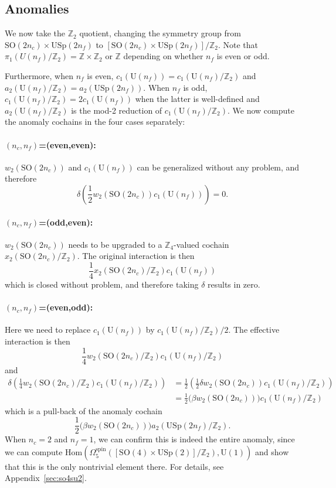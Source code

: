 \documentclass[12pt]{article}
\numberwithin{equation}{section}
\def\bZ{\mathbb{Z}}
\def\U{\mathrm{U}}
\def\SO{\mathrm{SO}}
\def\USp{\mathrm{USp}}
\begin{document}
\subsection{Anomalies}
We now take the $\bZ_2$ quotient, changing the symmetry group from 
$\SO(2n_c)\times \USp(2n_f)$ to $[\SO(2n_c)\times \USp(2n_f)]/\bZ_2$.
Note that $\pi_1(U(n_f)/\bZ_2)=\bZ\times \bZ_2$  or $\bZ$ depending on whether $n_f$ is even or odd.

Furthermore, when $n_f$ is even, $c_1(\U(n_f)) = c_1(\U(n_f)/\bZ_2)$ and $a_2(\U(n_f)/\bZ_2)=a_2(\USp(2n_f))$.
When $n_f$ is odd, $c_1(\U(n_f)/\bZ_2)=2 c_1(\U(n_f))$ when the latter is well-defined and $a_2(\U(n_f)/\bZ_2)$ is the mod-2 reduction of $c_1(\U(n_f)/\bZ_2)$.
We now compute the anomaly cochains in the four cases separately:
\paragraph{$(n_c,n_f)$=(even,even):}
$w_2(\SO(2n_c))$ and $c_1(\U(n_f))$ can be generalized without any problem,
and therefore \begin{equation}
\delta\left(\frac12 w_2(\SO(2n_c)) c_1(\U(n_f))\right) = 0.
\end{equation}

\paragraph{$(n_c,n_f)$=(odd,even):}
$w_2(\SO(2n_c))$ needs to be upgraded to a $\bZ_4$-valued cochain $x_2(\SO(2n_c)/\bZ_2)$.
The original interaction is then \begin{equation}
\frac14 x_2(\SO(2n_c)/\bZ_2) c_1(\U(n_f))
\end{equation}
which is closed without problem,
and therefore taking $\delta$ results in zero.

\paragraph{$(n_c,n_f)$=(even,odd):}
Here we need to replace $c_1(\U(n_f))$ by $c_1(\U(n_f)/\bZ_2)/2$.
The effective interaction is then \begin{equation}
\frac14 w_2(\SO(2n_c)/\bZ_2) c_1(\U(n_f)/\bZ_2) 
\end{equation} and \begin{align}
\delta\left(\frac14 w_2(\SO(2n_c)/\bZ_2) c_1(\U(n_f)/\bZ_2) \right)
&= \frac12 \left(\frac12\delta w_2(\SO(2n_c)) c_1(\U(n_f)/\bZ_2) \right) \\
&= \frac12 \Big(\beta w_2(\SO(2n_c))\Big)c_1(\U(n_f)/\bZ_2) 
\end{align}
which is a pull-back of the anomaly cochain
\begin{equation}
 \frac12 \Big(\beta w_2(\SO(2n_c))\Big)a_2(\USp(2n_f)/\bZ_2). 
\end{equation}
When $n_c=2$ and $n_f=1$, we can confirm this is indeed the entire anomaly,
since we can compute $\mathrm{Hom}(\Omega^\text{spin}_5([\SO(4)\times \USp(2)]/\bZ_2),\U(1))$
and show that this is the only nontrivial element there.
For details, see Appendix~\ref{sec:so4su2}.
\end{document}
